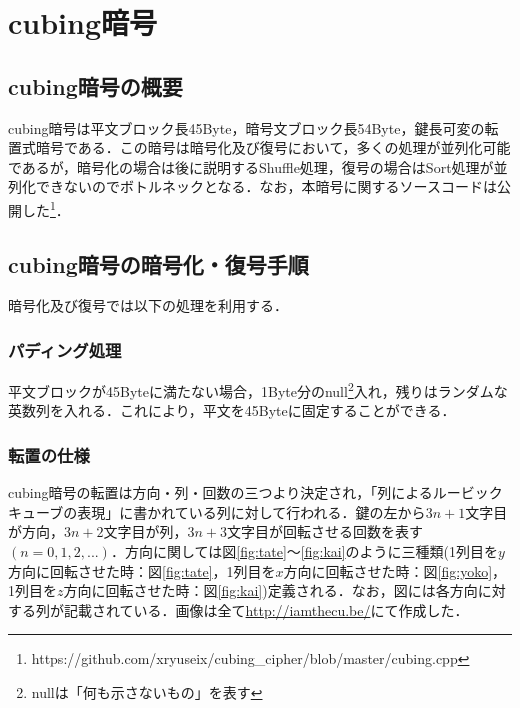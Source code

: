 \documentclass[a4j,titlepage]{jsarticle}
\begin{document}
\section{cubing暗号}
\subsection{cubing暗号の概要}
cubing暗号は平文ブロック長45Byte，暗号文ブロック長54Byte，鍵長可変の転置式暗号である．この暗号は暗号化及び復号において，多くの処理が並列化可能であるが，暗号化の場合は後に説明するShuffle処理，復号の場合はSort処理が並列化できないのでボトルネックとなる．なお，本暗号に関するソースコードは公開した\footnote{https://github.com/xryuseix/cubing\_cipher/blob/master/cubing.cpp}．

\subsection{cubing暗号の暗号化・復号手順}
暗号化及び復号では以下の処理を利用する．

\subsubsection{パディング処理}
平文ブロックが45Byteに満たない場合，1Byte分のnull\footnote{nullは「何も示さないもの」を表す}入れ，残りはランダムな英数列を入れる．これにより，平文を45Byteに固定することができる．

\subsubsection{転置の仕様}
cubing暗号の転置は方向・列・回数の三つより決定され，「列によるルービックキューブの表現」に書かれている列に対して行われる．鍵の左から\(3n+1\)文字目が方向，\(3n+2\)文字目が列，\(3n+3\)文字目が回転させる回数を表す\((n=0,1,2,...)\)．方向に関しては図\ref{fig:tate}〜\ref{fig:kai}のように三種類(1列目を\(y\)方向に回転させた時：図\ref{fig:tate}，1列目を\(x\)方向に回転させた時：図\ref{fig:yoko}，1列目を\(z\)方向に回転させた時：図\ref{fig:kai})定義される．なお，図には各方向に対する列が記載されている．画像は全て\url{http://iamthecu.be/}にて作成した．
\end{document}
